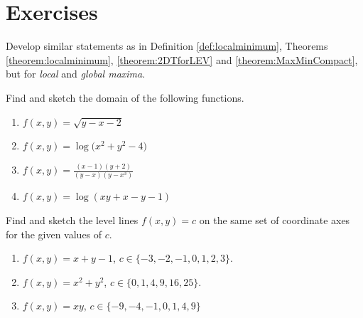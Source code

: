 
\section*{Exercises}
\begin{problem}\label{problem:maxima}
Develop similar statements as in Definition \ref{def:localminimum}, Theorems \ref{theorem:localminimum}, \ref{theorem:2DTforLEV} and \ref{theorem:MaxMinCompact}, but for \emph{local} and \emph{global maxima}.
\end{problem}

\begin{problem}[Domains]
Find and sketch the domain of the following functions.
\begin{enumerate}
	\item $f(x,y) = \sqrt{y-x-2}$
	\item $f(x,y) = \log \big( x^2+y^2-4 \big)$
	\item $f(x,y) = \frac{(x-1)(y+2)}{(y-x)(y-x^3)}$
	\item $f(x,y) = \log (xy+x-y-1)$
\end{enumerate}
\end{problem}

\begin{problem}
Find and sketch the level lines $f(x,y)=c$ on the same set of coordinate axes for the given values of $c$.
\begin{enumerate}
	\item $f(x,y) = x+y-1$, $c \in \{ -3, -2, -1, 0, 1, 2, 3\}$.
	\item $f(x,y) = x^2+y^2$, $c \in \{ 0, 1, 4, 9, 16, 25 \}$.
	\item $f(x,y) = xy$, $c \in \{ -9, -4, -1, 0, 1, 4, 9 \}$
\end{enumerate}
\end{problem}


